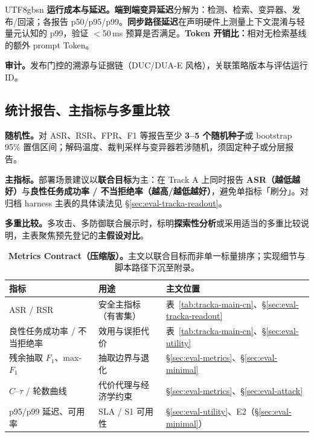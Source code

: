 \documentclass[letterpaper,twocolumn,10pt]{article}
\begin{document}
\begin{CJK}{UTF8}{gbsn}
\textbf{运行成本与延迟。}\textbf{端到端变异延迟}分解为：检测、检索、变异器、发布/回滚；各报告 p50/p95/p99。\textbf{同步路径延迟}在声明硬件上测量上下文混淆与轻量元认知的 p99，验证 $<$50\,ms 预算是否满足。\textbf{Token 开销比：}相对无检索基线的额外 prompt Token。

\textbf{审计。}发布门控的溯源与证据链（DUC/DUA-E 风格），关联策略版本与评估运行 ID。

\subsection{统计报告、主指标与多重比较}
\label{sec:eval-stats}

\textbf{随机性。}对 ASR、RSR、FPR、F1 等报告至少 \textbf{3--5 个随机种子}或 bootstrap 95\% 置信区间；解码温度、裁判采样与变异器若涉随机，须固定种子或分层报告。

\textbf{主指标。}部署场景建议以\textbf{联合目标}为主：在 Track A 上同时报告 \textbf{ASR（越低越好）}与\textbf{良性任务成功率 / 不当拒绝率（越高/越低越好）}，避免单指标「刷分」。对归档 harness 主表的具体读法见 \S\ref{sec:eval-tracka-readout}。

\textbf{多重比较。}多攻击、多防御联合展示时，标明\textbf{探索性分析}或采用适当的多重比较说明，主表聚焦预先登记的\textbf{主假设对比}。

\begin{table}[t]
\centering
\small
\setlength{\tabcolsep}{3pt}
\begin{tabular}{@{}p{1.55cm}p{2.05cm}p{2.65cm}@{}}
\toprule
\textbf{指标} & \textbf{用途} & \textbf{主文位置} \\
\midrule
ASR / RSR & 安全主指标（有害集） & 表~\ref{tab:tracka-main-cn}、\S\ref{sec:eval-tracka-readout} \\
良性任务成功率 / 不当拒绝率 & 效用与误拒代价 & 表~\ref{tab:tracka-main-cn}、\S\ref{sec:eval-utility} \\
残余抽取 $F_1$、max-$F_1$ & 抽取边界与退化 & \S\ref{sec:eval-metrics}、\S\ref{sec:eval-minimal} \\
$\hat{C}$--$\tau$ / 轮数曲线 & 代价代理与经济学约束 & \S\ref{sec:eval-metrics}、\S\ref{sec:eval-attack} \\
p95/p99 延迟、可用率 & SLA / S1 可用性 & \S\ref{sec:eval-utility}、E2（\S\ref{sec:eval-minimal}） \\
\bottomrule
\end{tabular}
\caption{\textbf{Metrics Contract（压缩版）。}主文以联合目标而非单一标量排序；实现细节与脚本路径下沉至附录。}
\label{tab:metrics-contract}
\end{table}


\end{CJK}
\end{document}
